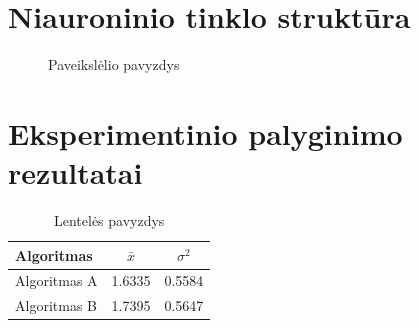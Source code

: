 \documentclass{VUMIFInfKursinis}
\begin{document}
\section{Niauroninio tinklo struktūra}
\begin{figure}[H]
    \centering
    \caption{Paveikslėlio pavyzdys}   %
    \label{img:mlp}
\end{figure}


\section{Eksperimentinio palyginimo rezultatai}
\begin{table}[H]\footnotesize
  \centering
  \caption{Lentelės pavyzdys}    %
  {\begin{tabular}{|l|c|c|} \hline
    Algoritmas & $\bar{x}$ & $\sigma^{2}$ \\
    \hline
    Algoritmas A  & 1.6335    & 0.5584       \\
    Algoritmas B  & 1.7395    & 0.5647       \\
    \hline
  \end{tabular}}
  \label{tab:table example}
\end{table}
\end{document}
